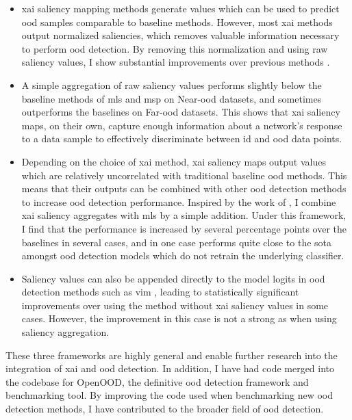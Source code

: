 \documentclass[UKenglish]{uiomasterthesis} %
\theoremstyle{definition}
\begin{document}
\begin{itemize}
    \item \ac{xai} saliency mapping methods generate values which can be used to predict \ac{ood} samples comparable to baseline methods. However, most \ac{xai} methods output normalized saliencies, which removes valuable information necessary to perform \ac{ood} detection. By removing this normalization and using raw saliency values, I show substantial improvements over previous methods \cite{martinez}.
    \item A simple aggregation of raw saliency values performs slightly below the baseline methods of \ac{mls} and \ac{msp} on Near-\ac{ood} datasets, and sometimes outperforms the baselines on Far-\ac{ood} datasets. This shows that \ac{xai} saliency maps, on their own, capture enough information about a network's response to a data sample to effectively discriminate between \ac{id} and \ac{ood} data points.%
    \item Depending on the choice of \ac{xai} method, \ac{xai} saliency maps output values which are relatively uncorrelated with traditional baseline \ac{ood} methods. This means that their outputs can be combined with other \ac{ood} detection methods to increase \ac{ood} detection performance. Inspired by the work of \cite{combood}, I combine \ac{xai} saliency aggregates with \ac{mls} by a simple addition. Under this framework, I find that the performance is increased by several percentage points over the baselines in several cases, and in one case performs quite close to the \ac{sota} amongst \ac{ood} detection models which do not retrain the underlying classifier.
    \item Saliency values can also be appended directly to the model logits in \ac{ood} detection methods such as \ac{vim} \cite{vim}, leading to statistically significant improvements over using the method without \ac{xai} saliency values in some cases. However, the improvement in this case is not a strong as when using saliency aggregation.
\end{itemize}

These three frameworks are highly general and enable further research into the integration of \ac{xai} and \ac{ood} detection. In addition, I have had code merged into the codebase for OpenOOD, the definitive \ac{ood} detection framework and benchmarking tool. By improving the code used when benchmarking new \ac{ood} detection methods, I have contributed to the broader field of \ac{ood} detection.
\end{document}
